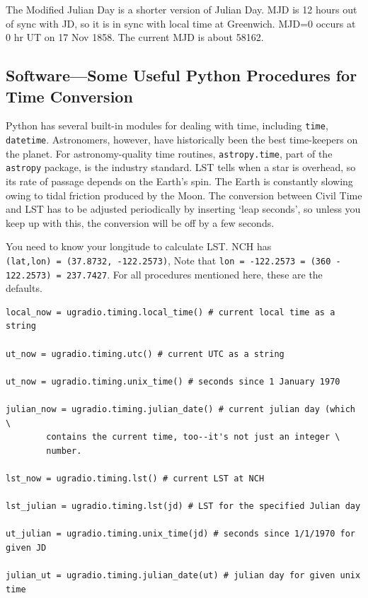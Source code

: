 \documentclass[12pt,preprint]{aastex}
\begin{document}
The Modified Julian Day is a shorter version of Julian Day. MJD is 12
hours out of sync with JD, so it is in sync with local time at
Greenwich. MJD=0 occurs at 0 hr UT on 17 Nov 1858.  The current MJD is
about 58162. %

\subsection{ Software---Some Useful Python Procedures for Time Conversion}

Python has several built-in modules for dealing with time, including {\tt time}, {\tt datetime}.
Astronomers, however, have historically been the best time-keepers on the planet.  For
astronomy-quality time routines, {\tt astropy.time}, part of the {\tt astropy} package, is
the industry standard.
LST tells when a star
is overhead, so its rate of passage depends on the Earth's spin. The
Earth is constantly slowing owing to tidal friction produced by the
Moon. The conversion between Civil Time and LST has to be adjusted
periodically by inserting `leap seconds', so unless you keep up with
this, the conversion will be off by a few seconds. 

You need to know your
longitude to calculate LST. NCH has \\
{\tt (lat,lon) = (37.8732, -122.2573)},  Note that {\tt lon = -122.2573 = (360 - 122.2573) = 237.7427}. 
For all procedures mentioned here, these are the defaults.

\begin{verbatim}
local_now = ugradio.timing.local_time() # current local time as a string

ut_now = ugradio.timing.utc() # current UTC as a string

ut_now = ugradio.timing.unix_time() # seconds since 1 January 1970

julian_now = ugradio.timing.julian_date() # current julian day (which \
        contains the current time, too--it's not just an integer \
        number. 
                                                                               
lst_now = ugradio.timing.lst() # current LST at NCH
                                                                               
lst_julian = ugradio.timing.lst(jd) # LST for the specified Julian day                                                             
                                                                               
ut_julian = ugradio.timing.unix_time(jd) # seconds since 1/1/1970 for given JD
                                                                               
julian_ut = ugradio.timing.julian_date(ut) # julian day for given unix time
\end{verbatim}
\end{document}
